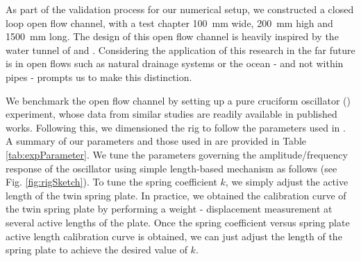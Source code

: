 \documentclass[oneside]{utmthesis}
\begin{document}
As part of the validation process for our numerical setup, we constructed a closed loop open flow channel, with a test chapter \SI{100}{\milli\metre} wide, \SI{200}{\milli\metre} high and \SI{1500}{\milli\metre} long. The design of this open flow channel is heavily inspired by the water tunnel of \citet{Nguyen2012} and \citet{Koide2013}. Considering the application of this research in the far future is in open flows such as natural drainage systems or the ocean - and not within pipes - prompts us to make this distinction.

We benchmark the open flow channel by setting up a pure cruciform oscillator (\angfi{}) experiment, whose data from similar studies are readily available in published works. Following this, we dimensioned the rig to follow the parameters used in \citet{Koide2013}. A summary of our parameters and those used in \citet{Koide2013} are provided in Table \ref{tab:expParameter}. We tune the parameters governing the amplitude/frequency response of the oscillator using simple length-based mechanism as follows (see Fig. \ref{fig:rigSketch}). To tune the spring coefficient $k$, we simply adjust the active length of the twin spring plate. In practice, we obtained the calibration curve of the twin spring plate by performing a weight - displacement measurement \citep{Sun2016} at several active lengths of the plate. Once the spring coefficient versus spring plate active length calibration curve is obtained, we can just adjust the length of the spring plate to achieve the desired value of $k$.
\end{document}
